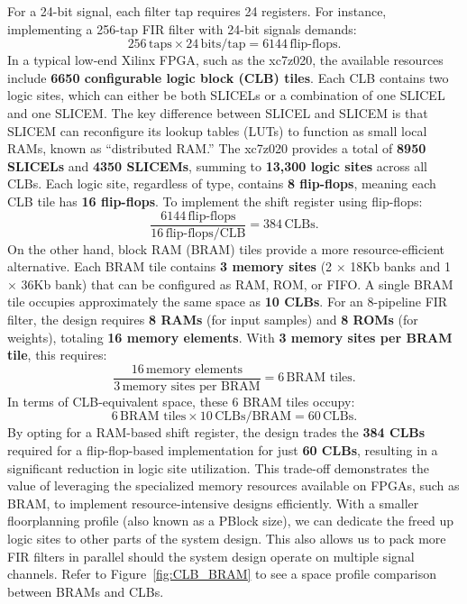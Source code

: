 \documentclass{article}
\begin{document}
    For a 24-bit signal, each filter tap requires 24 registers.
    For instance, implementing a 256-tap FIR filter with 24-bit signals demands:
    \[
        256 \, \text{taps} \times 24 \, \text{bits/tap} = 6144 \, \text{flip-flops}.
    \]
    In a typical low-end Xilinx FPGA, such as the xc7z020, the available resources include \textbf{6650 configurable logic block (CLB) tiles}.
    Each CLB contains two logic sites, which can either be both SLICELs or a combination of one SLICEL and one SLICEM.
    The key difference between SLICEL and SLICEM is that SLICEM can reconfigure its lookup tables (LUTs) to function as small local RAMs, known as ``distributed RAM.''
    The xc7z020 provides a total of \textbf{8950 SLICELs} and \textbf{4350 SLICEMs}, summing to \textbf{13,300 logic sites} across all CLBs.
    Each logic site, regardless of type, contains \textbf{8 flip-flops}, meaning each CLB tile has \textbf{16 flip-flops}.
    To implement the shift register using flip-flops:
    \[
        \frac{6144 \, \text{flip-flops}}{16 \, \text{flip-flops/CLB}} = 384 \, \text{CLBs}.
    \]
    On the other hand, block RAM (BRAM) tiles provide a more resource-efficient alternative.
    Each BRAM tile contains \textbf{3 memory sites} (2 $\times$ 18Kb banks and 1 $\times$ 36Kb bank) that can be configured as RAM, ROM, or FIFO.
    A single BRAM tile occupies approximately the same space as \textbf{10 CLBs}.
    For an 8-pipeline FIR filter, the design requires \textbf{8 RAMs} (for input samples) and \textbf{8 ROMs} (for weights), totaling \textbf{16 memory elements}.
    With \textbf{3 memory sites per BRAM tile}, this requires:
    \[
        \frac{16 \, \text{memory elements}}{3 \, \text{memory sites per BRAM}} = 6 \, \text{BRAM tiles}.
    \]
    In terms of CLB-equivalent space, these 6 BRAM tiles occupy:
    \[
        6 \, \text{BRAM tiles} \times 10 \, \text{CLBs/BRAM} = 60 \, \text{CLBs}.
    \]
    By opting for a RAM-based shift register, the design trades the \textbf{384 CLBs} required for a flip-flop-based implementation for just \textbf{60 CLBs}, resulting in a significant reduction in logic site utilization.
    This trade-off demonstrates the value of leveraging the specialized memory resources available on FPGAs, such as BRAM, to implement resource-intensive designs efficiently.
    With a smaller floorplanning profile (also known as a PBlock size), we can dedicate the freed up logic sites to other parts of the system design.
    This also allows us to pack more FIR filters in parallel should the system design operate on multiple signal channels.
    Refer to Figure~\ref{fig:CLB_BRAM} to see a space profile comparison between BRAMs and CLBs.
\end{document}

